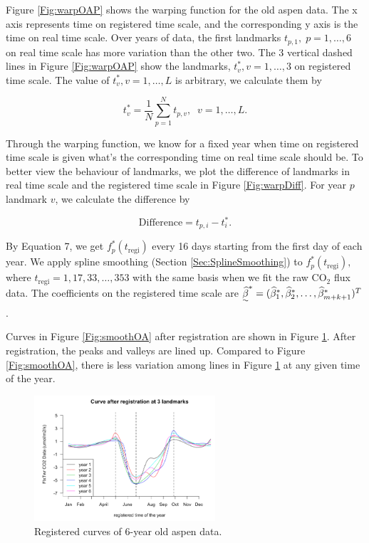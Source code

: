\documentclass{article}\usepackage[]{graphicx}\usepackage[]{color}
\begin{document}
Figure \ref{Fig:warpOAP} shows the warping function for the old aspen data. 
The x axis represents time on registered time scale, and the corresponding y axis is the time on real time scale.
Over years of data, the first landmarks $t_{p,1},\;p=1,\dots,6$ on real time scale has more variation than the other two. The 3 vertical dashed lines in Figure \ref{Fig:warpOAP} show the landmarks, $t_v^{*}, v=1,\dots,3$ on registered time scale. The value of $t_v^{*}, v=1,\dots,L$ is arbitrary, we calculate them by

\begin{equation}
t_v^{*} = \frac{1}{N}\sum_{p=1}^{N} t_{p,v},\;\;v=1,\dots,L.
\end{equation}

Through the warping function, we know for a fixed year when time on registered time scale is given what's the corresponding time on real time scale should be. To better view the behaviour of landmarks, we plot the difference of landmarks in real time scale and the registered time scale in Figure \ref{Fig:warpDiff}. For year $p$ landmark $v$, we calculate the difference by

\begin{equation}
\textrm{Difference} = t_{p,i} - t_{i}^{*}.
\end{equation}



By Equation 7, we get $f^{*}_p(t_{\textrm{regi}})$ every 16 days starting from the first day of each year. We apply spline smoothing (Section \ref{Sec:SplineSmoothing}) to $f^{*}_p(t_{\textrm{regi}}),$ where $t_{\textrm{regi}}=1,17,33,\dots,353$ with the same basis when we fit the raw CO$_2$ flux data. The coefficients on the registered time scale are $\uwave{\widehat{\beta}}^{*} = (\widehat{\beta}^{*}_1,\widehat{\beta}^{*}_2,\dots,\widehat{\beta}^{*}_{m+k+1})^{T}$.  

Curves in Figure \ref{Fig:smoothOA} after registration are shown in Figure \ref{Fig:regiOA}. After registration, the peaks and valleys are lined up. Compared to Figure \ref{Fig:smoothOA}, there is less variation among lines in Figure \ref{Fig:regiOA} at any given time of the year.

\begin{figure}[!ht]
\centering
\includegraphics[width=0.6\textwidth]{Regi1.png}
\caption{Registered curves of 6-year old aspen data.}\label{Fig:regiOA}
\end{figure}
\end{document}
